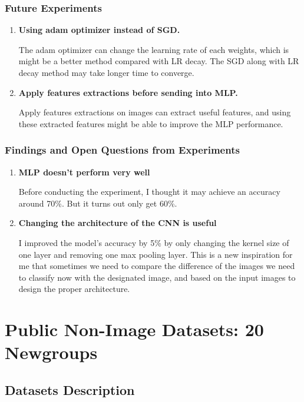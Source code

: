 \documentclass[twocolumn, draft]{extarticle}
\begin{document}
\subsubsection{Future Experiments}

\begin{enumerate}
\item \textbf{Using adam optimizer instead of SGD.}

The adam optimizer can change the learning rate of each weights, which is might be a better method compared with LR decay. The SGD along with LR decay method may take longer time to converge.
\item \textbf{Apply features extractions before sending into MLP.}

Apply features extractions on images can extract useful features, and using these extracted features might be able to improve the MLP performance.
\end{enumerate}

\subsubsection{Findings and Open Questions from Experiments}

\begin{enumerate}
\item \textbf{MLP doesn't perform very well}

Before conducting the experiment, I thought it may achieve an accuracy around 70\%. But it turns out only get 60\%.

\item \textbf{Changing the architecture of the CNN is useful}

I improved the model's accuracy by 5\% by only changing the kernel size of one layer and removing one max pooling layer. This is a new inspiration for me that sometimes we need to compare the difference of the images we need to classify now with the designated image, and based on the input images to design the proper architecture. 
\end{enumerate}

\section{Public Non-Image Datasets: 20 Newgroups}
\subsection{Datasets Description}
\end{document}
